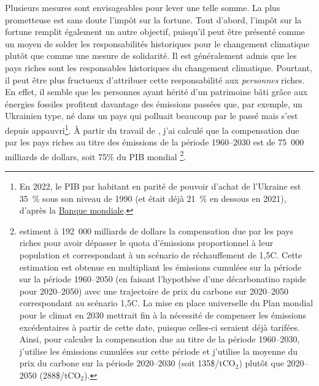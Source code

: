 \documentclass[a5paper,french]{memoir}
\begin{document}
Plusieurs mesures sont envisageables pour lever une telle somme. La plus prometteuse est sans doute l'impôt sur la fortune. Tout d'abord, l'impôt sur la fortune remplit également un autre objectif, puisqu'il peut être présenté comme un moyen de solder les responsabilités historiques pour le changement climatique plutôt que comme une mesure de solidarité. Il est généralement admis que les pays riches sont les responsables historiques du changement climatique. Pourtant, il peut être plus fructueux d'attribuer cette responsabilité aux \textit{personnes} riches. En effet, il semble que les personnes ayant hérité d'un patrimoine bâti grâce aux énergies fossiles profitent davantage des émissions passées que, par exemple, un Ukrainien type, né dans un pays qui polluait beaucoup par le passé mais s'est depuis appauvri\footnote{En 2022, le PIB par habitant en parité de pouvoir d'achat de l'Ukraine est 35~\% sous son niveau de 1990 (et était déjà 21~\% en dessous en 2021), d'après la \href{https://data.worldbank.org/indicator/NY.GDP.PCAP.PP.KD?locations=UA}{Banque mondiale}.}. %
À partir du travail de \cite{fanning_compensation_2023}, j'ai calculé que la compensation due par les pays riches au titre des émissions de la période 1960--2030 est de 75~000 milliards de dollars, soit 75\% du PIB mondial
\footnote{\cite{fanning_compensation_2023} estiment à 192~000 milliards de dollars la compensation due par les pays riches pour avoir dépasser le quota d'émissions proportionnel à leur population et correspondant à un scénario de réchauffement de 1,5\textdegree{}C. Cette estimation est obtenue en multipliant les émissions cumulées sur la période sur la période 1960--2050 (en faisant l'hypothèse d'une décarbonatino rapide pour 2020--2050) avec une trajectoire de prix du carbone sur 2020--2050 correspondant au scénario 1,5\textdegree{}C. La mise en place universelle du Plan mondial pour le climat en 2030 mettrait fin à la nécessité de compenser les émissions excédentaires à partir de cette date, puisque celles-ci seraient déjà tarifées. Ainsi, pour calculer la compensation due au titre de la période 1960--2030, j'utilise les émissions cumulées sur cette période et j'utilise la moyenne du prix du carbone sur la période 2020--2030 (soit 135\$/tCO$_\text{2}$) plutôt que 2020--2050 (288\$/tCO$_\text{2}$).}. %
\end{document}
